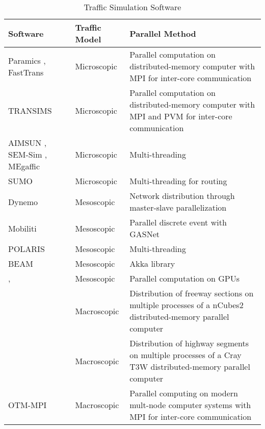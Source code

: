 \begin{table*}[htbp]
\centering
\begin{tabular} { | p{20mm} | p{20mm} | p{125mm}| } 
	\hline
	\hline
	\textbf{Software} & \textbf{Traffic Model} & \textbf{Parallel Method}\\ \hline
	Paramics \cite{cameron1996paramics}, FastTrans \cite{thulasidasan2009accelerating}    & Microscopic & Parallel computation on distributed-memory computer with MPI for inter-core communication \\ \hline
	TRANSIMS \cite{robertson1969transyt}     & Microscopic & Parallel computation on distributed-memory computer with MPI and PVM for inter-core communication \\ \hline
	AIMSUN \cite{ferrer1993aimsun2}, SEM-Sim \cite{aydt2013multi},  MEgaffic \cite{osogami2012research}     & Microscopic & Multi-threading \\ \hline
	SUMO \cite{behrisch2011sumo}    & Microscopic & Multi-threading for routing \\ \hline
	Dynemo \cite{nokel2002parallel}  & Mesoscopic & Network distribution through master-slave parallelization \\ \hline
	Mobiliti \cite{chan2018mobiliti}     & Mesoscopic & Parallel discrete event with GASNet \\ \hline
	POLARIS \cite{auld2016polaris}     & Mesoscopic & Multi-threading \\ \hline
	BEAM \cite{aboutBeam}    & Mesoscopic & Akka library \\ \hline
	\cite{xu2014mesoscopic,song2017supporting}, \cite{strippgen2009multi}     & Mesoscopic & Parallel computation on GPUs \\ \hline
	\cite{chronopoulos1998real}     & Macroscopic & Distribution of freeway sections on multiple processes of a nCubes2 distributed-memory parallel computer \\ \hline
	\cite{johnston1999parallelization}     & Macroscopic & Distribution of highway segments on multiple processes of a Cray T3W distributed-memory parallel computer \\ \hline
	OTM-MPI \cite{otmmpi}  & Macroscopic & Parallel computing on modern mult-node computer systems with MPI for inter-core communication\\ \hline
\end{tabular}
\caption{Traffic Simulation Software}
\label{tab:softwares}
\end{table*}

